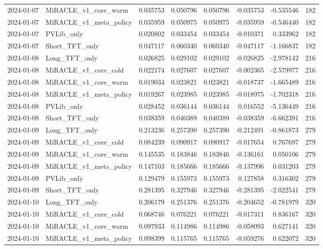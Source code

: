 \begin{tabular}{llrrrrrr}
2024-01-07 & MiRACLE_v1_core_warm & 0.035753 & 0.050796 & 0.050796 & -0.035753 & -0.535546 & 182 \\
2024-01-07 & MiRACLE_v1_meta_policy & 0.035959 & 0.050975 & 0.050975 & -0.035959 & -0.546440 & 182 \\
2024-01-07 & PVLib_only & 0.020802 & 0.033454 & 0.033454 & -0.010371 & 0.333962 & 182 \\
2024-01-07 & Short_TFT_only & 0.047117 & 0.060340 & 0.060340 & -0.047117 & -1.166837 & 182 \\
2024-01-08 & Long_TFT_only & 0.026825 & 0.029102 & 0.029102 & -0.026825 & -2.978142 & 216 \\
2024-01-08 & MiRACLE_v1_core_cold & 0.022174 & 0.027607 & 0.027607 & -0.002365 & -2.579977 & 216 \\
2024-01-08 & MiRACLE_v1_core_warm & 0.019034 & 0.023821 & 0.023821 & -0.018737 & -1.665489 & 216 \\
2024-01-08 & MiRACLE_v1_meta_policy & 0.019267 & 0.023985 & 0.023985 & -0.018975 & -1.702318 & 216 \\
2024-01-08 & PVLib_only & 0.028452 & 0.036144 & 0.036144 & 0.016552 & -5.136449 & 216 \\
2024-01-08 & Short_TFT_only & 0.038359 & 0.040389 & 0.040389 & -0.038359 & -6.662391 & 216 \\
2024-01-09 & Long_TFT_only & 0.213236 & 0.257390 & 0.257390 & -0.212491 & -0.861873 & 279 \\
2024-01-09 & MiRACLE_v1_core_cold & 0.084239 & 0.090917 & 0.090917 & -0.017654 & 0.767697 & 279 \\
2024-01-09 & MiRACLE_v1_core_warm & 0.145535 & 0.183846 & 0.183846 & -0.136161 & 0.050106 & 279 \\
2024-01-09 & MiRACLE_v1_meta_policy & 0.147103 & 0.185666 & 0.185666 & -0.137996 & 0.031203 & 279 \\
2024-01-09 & PVLib_only & 0.129479 & 0.155973 & 0.155973 & 0.127858 & 0.316302 & 279 \\
2024-01-09 & Short_TFT_only & 0.281395 & 0.327946 & 0.327946 & -0.281395 & -2.022541 & 279 \\
2024-01-10 & Long_TFT_only & 0.206179 & 0.251376 & 0.251376 & -0.204652 & -0.781979 & 320 \\
2024-01-10 & MiRACLE_v1_core_cold & 0.068746 & 0.076221 & 0.076221 & -0.017311 & 0.836167 & 320 \\
2024-01-10 & MiRACLE_v1_core_warm & 0.097933 & 0.114986 & 0.114986 & -0.058093 & 0.627141 & 320 \\
2024-01-10 & MiRACLE_v1_meta_policy & 0.098399 & 0.115765 & 0.115765 & -0.059276 & 0.622072 & 320 \\

\end{tabular}
